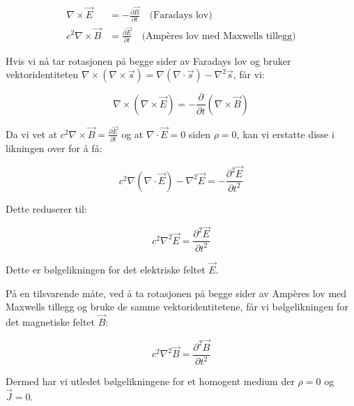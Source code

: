 \begin{equation*}
\begin{aligned}
\nabla \times \vec{E} &= -\frac{\partial \vec{B}}{\partial t} \quad \text{(Faradays lov)}\\
c^2\nabla \times\vec{B} &= \frac{\partial \vec{E}}{\partial t} \quad \text{(Ampères lov med Maxwells tillegg)}
\end{aligned}
\end{equation*}

Hvis vi nå tar rotasjonen på begge sider av Faradays lov og bruker vektoridentiteten $\nabla \times (\nabla \times \vec{s}) = \nabla (\nabla \cdot \vec{s}) - \nabla^2 \vec{s}$, får vi:

\begin{equation*}
\nabla \times (\nabla \times \vec{E}) = -\frac{\partial}{\partial t} (\nabla \times \vec{B})
\end{equation*}

Da vi vet at $c^2\nabla \times \vec{B} = \frac{\partial \vec{E}}{\partial t}$ og at $\nabla \cdot \vec{E} = 0$ siden $\rho = 0$, kan vi erstatte disse i likningen over for å få:

\begin{equation*}
c^2\nabla (\nabla \cdot \vec{E}) - \nabla^2 \vec{E} = -\frac{\partial^2 \vec{E}}{\partial t^2}
\end{equation*}

Dette reduserer til:

\begin{equation*}
c^2\nabla^2 \vec{E} = \frac{\partial^2 \vec{E}}{\partial t^2}
\end{equation*}

Dette er bølgelikningen for det elektriske feltet $\vec{E}$.

På en tilsvarende måte, ved å ta rotasjonen på begge sider av Ampères lov med Maxwells tillegg og bruke de samme vektoridentitetene, får vi bølgelikningen for det magnetiske feltet $\vec{B}$:

\begin{equation*}
c^2\nabla^2 \vec{B} =\frac{\partial^2 \vec{B}}{\partial t^2}
\end{equation*}

Dermed har vi utledet bølgelikningene for et homogent medium der $\rho=0$ og $\vec{J}=0$.